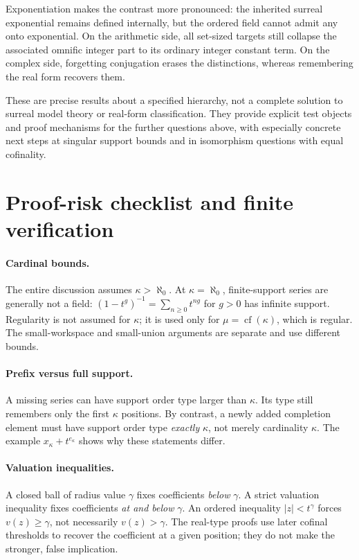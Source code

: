 \documentclass[11pt,letterpaper]{article}
\numberwithin{equation}{section}
\theoremstyle{definition}
\theoremstyle{remark}
\newcommand{\cf}{\operatorname{cf}}
\begin{document}
Exponentiation makes the contrast more pronounced: the inherited surreal exponential remains defined internally, but the ordered field cannot admit any onto exponential. On the arithmetic side, all set-sized targets still collapse the associated omnific integer part to its ordinary integer constant term. On the complex side, forgetting conjugation erases the distinctions, whereas remembering the real form recovers them.

These are precise results about a specified hierarchy, not a complete solution to surreal model theory or real-form classification. They provide explicit test objects and proof mechanisms for the further questions above, with especially concrete next steps at singular support bounds and in isomorphism questions with equal cofinality.

\appendix
{}
\section{Proof-risk checklist and finite verification}
\label{fkc:app:checks}

\paragraph{Cardinal bounds.}
The entire discussion assumes $\kappa>\aleph_0$. At $\kappa=\aleph_0$, finite-support series are generally not a field: $(1-t^g)^{-1}=\sum_{n\ge0}t^{ng}$ for $g>0$ has infinite support. Regularity is not assumed for $\kappa$; it is used only for $\mu=\cf(\kappa)$, which is regular. The small-workspace and small-union arguments are separate and use different bounds.

\paragraph{Prefix versus full support.}
A missing series can have support order type larger than $\kappa$. Its type still remembers only the first $\kappa$ positions. By contrast, a newly added completion element must have support order type \emph{exactly} $\kappa$, not merely cardinality $\kappa$. The example $x_\kappa+t^{e_\kappa}$ shows why these statements differ.

\paragraph{Valuation inequalities.}
A closed ball of radius value $\gamma$ fixes coefficients \emph{below} $\gamma$. A strict valuation inequality fixes coefficients \emph{at and below} $\gamma$. An ordered inequality $|z|<t^\gamma$ forces $v(z)\ge\gamma$, not necessarily $v(z)>\gamma$. The real-type proofs use later cofinal thresholds to recover the coefficient at a given position; they do not make the stronger, false implication.
\end{document}
